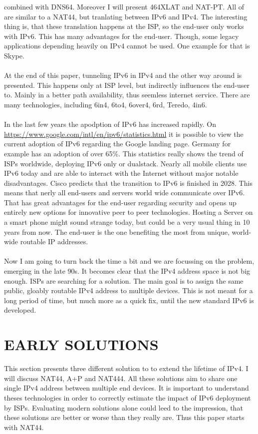 \documentclass[format=sigconf, natbib=true, nonacm=true]{acmart}
\begin{document}
combined with DNS64. Moreover I will present 464XLAT and NAT-PT. All of are similar to a NAT44, but tranlating between IPv6 and IPv4. The interesting thing is, that these translation happens at the ISP, so the end-user only works with IPv6. This has many advantages for the end-user. Though, some legacy applications depending heavily on IPv4 cannot be used. One example for that is Skype.\\\\At the end of this paper, tunneling IPv6 in IPv4 and the other way around is presented. This happens only at ISP level, but indirectly influences the end-user to. Mainly in a better path availability, thus seemless internet service. There are many technologies, including 6in4, 6to4, 6over4, 6rd, Teredo, 4in6.\\\\In the last few years the apodption of IPv6 has increased rapidly. On \url{https://www.google.com/intl/en/ipv6/statistics.html} it is possible to view the current adoption of IPv6 regarding the Google landing page. Germany for example has an adoption of over 65\%. This statistics really shows the trend of ISPs worldwide, deploying IPv6 only or dualstack. Nearly all mobile clients use IPv6 today and are able to interact with the Internet without major notable disadvantages. Cisco predicts that the transition to IPv6 is finished in 2028. This means that nerly all end-users and servers world wide communicate over IPv6. That has great advantages for the end-user regarding security and opens up entirely new options for innovative peer to peer technologies. Hosting a Server on a smart phone might sound strange today, but could be a very usual thing in 10 years from now. The end-user is the one benefiting the most from unique, world-wide routable IP addresses.\\\\Now I am going to turn back the time a bit and we are focussing on the problem, emerging in the late 90s. It becomes clear that the IPv4 address space is not big enough. ISPs are searching for a solution. The main goal is to assign the same public, gloably routable IPv4 address to multiple devices. This is not meant for a long period of time, but much more as a quick fix, until the new standard IPv6 is developed.
    
    \section{EARLY SOLUTIONS}
    This section presents three different solution to to extend the lifetime of IPv4. I will discuss NAT44, A+P and NAT444. All these solutions aim to share one single IPv4 address between multiple end devices. It is important to understand theses technologies in order to correctly estimate the impact of IPv6 deployment by ISPs. Evaluating modern solutions alone could leed to the impression, that these solutions are better or worse than they really are. Thus this paper starts with NAT44.
\end{document}

